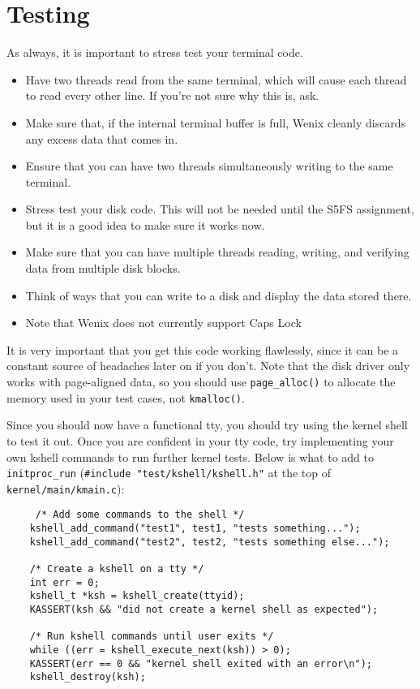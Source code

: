 \section{Testing}
As always, it is important to stress test your terminal code.
\begin{itemize}
    \item Have two threads read from the same terminal, which will cause each thread to read every other line. If you're not sure why this is, ask.
    \item Make sure that, if the internal terminal buffer is full, Wenix cleanly discards any excess data that comes in.
    \item Ensure that you can have two threads simultaneously writing to the same terminal.
    \item Stress test your disk code. This will not be needed until the S5FS assignment, but it is a good idea to make sure it works now.
    \item Make sure that you can have multiple threads reading, writing, and verifying data from multiple disk blocks.
    \item Think of ways that you can write to a disk and display the data stored there.
    \item Note that Wenix does not currently support Caps Lock
\end{itemize}
 It is very important that you get this code working flawlessly, since it can be a constant source of headaches later on if you don't. Note that the disk driver only works with page-aligned data, so you should use \texttt{page\_alloc()} to allocate the memory used in your test cases, not \texttt{kmalloc()}.

Since you should now have a functional tty, you should try using the kernel shell to test it out. Once you are confident in your tty code, try implementing your own kshell commands to run further kernel tests. Below is what to add to \texttt{initproc\_run} (\texttt{\#include "test/kshell/kshell.h"} at the top of \texttt{kernel/main/kmain.c}):
\begin{verbatim}
     /* Add some commands to the shell */
    kshell_add_command("test1", test1, "tests something...");
    kshell_add_command("test2", test2, "tests something else...");
 
    /* Create a kshell on a tty */
    int err = 0;
    kshell_t *ksh = kshell_create(ttyid);
    KASSERT(ksh && "did not create a kernel shell as expected");
 
    /* Run kshell commands until user exits */
    while ((err = kshell_execute_next(ksh)) > 0);
    KASSERT(err == 0 && "kernel shell exited with an error\n");
    kshell_destroy(ksh);
\end{verbatim}
